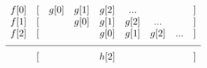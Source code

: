 
%

\[ 
\begin{matrix}
f[0]     & [ & g[0] & g[1] & g[2] & ... &     &    & ] \\
f[1]     & [ &     & g[0] & g[1] & g[2] & ... &    & ] \\   
f[2]     & [ &     &     & g[0] & g[1] & g[2] & ...& ] \\ 
\noalign{\vskip 2mm}
\hline
\noalign{\vskip 2mm}
        & [ &     &     & h[2] &     &    &    & ] \\
\end{matrix}
\]


 
